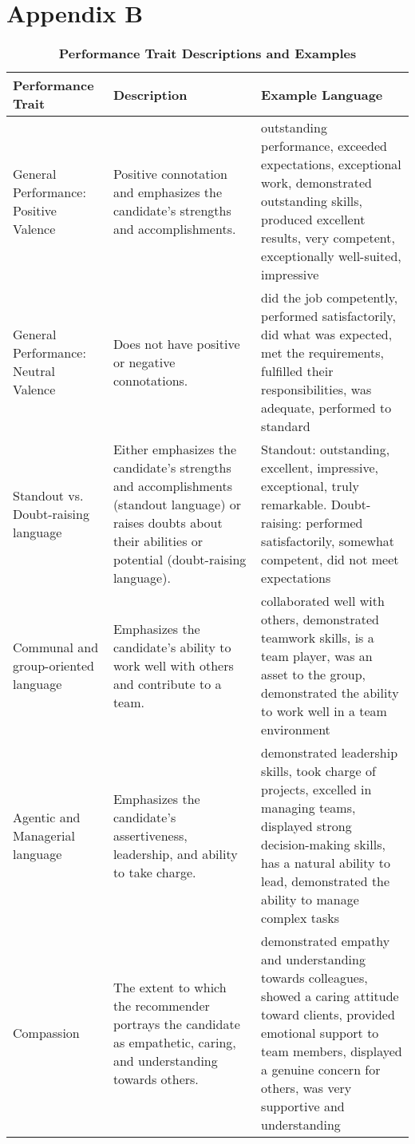 \documentclass[12pt]{caltech_thesis}
\begin{document}
\begin{table}[htbp]
\section{Appendix B}
   \centering
   \caption{\textbf{Performance Trait Descriptions and Examples}}
   \label{tab:performance_traits}
   \small
   \begin{tabular}{@{}p{3.5cm}p{6.5cm}p{4cm}@{}}
   \toprule
   \textbf{Performance Trait} & \textbf{Description} & \textbf{Example Language} \\
   \midrule
   General Performance: Positive Valence & Positive connotation and emphasizes the candidate’s strengths and accomplishments. & outstanding performance, exceeded expectations, exceptional work, demonstrated outstanding skills, produced excellent results, very competent, exceptionally well-suited, impressive \\
   \midrule
   General Performance: Neutral Valence & Does not have positive or negative connotations. & did the job competently, performed satisfactorily, did what was expected, met the requirements, fulfilled their responsibilities, was adequate, performed to standard \\
   \midrule
   Standout vs. Doubt-raising language & Either emphasizes the candidate’s strengths and accomplishments (standout language) or raises doubts about their abilities or potential (doubt-raising language). & Standout: outstanding, excellent, impressive, exceptional, truly remarkable. Doubt-raising: performed satisfactorily, somewhat competent, did not meet expectations \\
   \midrule
   Communal and group-oriented language & Emphasizes the candidate’s ability to work well with others and contribute to a team. & collaborated well with others, demonstrated teamwork skills, is a team player, was an asset to the group, demonstrated the ability to work well in a team environment \\
   \midrule
   Agentic and Managerial language & Emphasizes the candidate’s assertiveness, leadership, and ability to take charge. & demonstrated leadership skills, took charge of projects, excelled in managing teams, displayed strong decision-making skills, has a natural ability to lead, demonstrated the ability to manage complex tasks \\
   \midrule
   Compassion & The extent to which the recommender portrays the candidate as empathetic, caring, and understanding towards others. & demonstrated empathy and understanding towards colleagues, showed a caring attitude toward clients, provided emotional support to team members, displayed a genuine concern for others, was very supportive and understanding \\
   \bottomrule
   \end{tabular}
   \end{table}   
\restoregeometry
   
   
   
\end{document}
